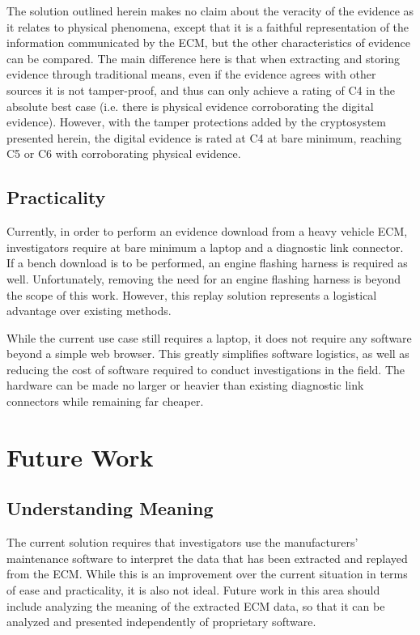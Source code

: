 The solution outlined herein makes no claim about the veracity of the evidence as it relates to physical phenomena, except that it is a faithful representation of the information communicated
by the ECM, but the other characteristics of evidence can be compared. The main difference here is that when extracting and storing evidence through traditional means, even if the
evidence agrees with other sources it is not tamper-proof, and thus can only achieve a rating of C4 in the absolute best case (i.e. there is physical evidence corroborating the 
digital evidence). However, with the tamper protections added by the cryptosystem presented herein, the digital evidence is rated at C4 at bare minimum, reaching C5 or C6 with corroborating
physical evidence. 

\subsection{Practicality}

Currently, in order to perform an evidence download from a heavy vehicle ECM, investigators require at bare minimum a laptop and a diagnostic link connector.
If a bench download is to be performed, an engine flashing harness is required as well. Unfortunately, removing the need for an engine flashing harness is
beyond the scope of this work. However, this replay solution represents a logistical advantage over existing methods.

While the current use case still requires a laptop, it does not require any software beyond a simple web browser. This greatly simplifies software logistics, as well
as reducing the cost of software required to conduct investigations in the field. The hardware can be made no larger or heavier than existing diagnostic link connectors
while remaining far cheaper.

\section{Future Work}

\subsection{Understanding Meaning}

The current solution requires that investigators use the manufacturers' maintenance software to interpret the data that has been extracted and replayed from the ECM.
While this is an improvement over the current situation in terms of ease and practicality, it is also not ideal. Future work in this area should include analyzing the
meaning of the extracted ECM data, so that it can be analyzed and presented independently of proprietary software.

